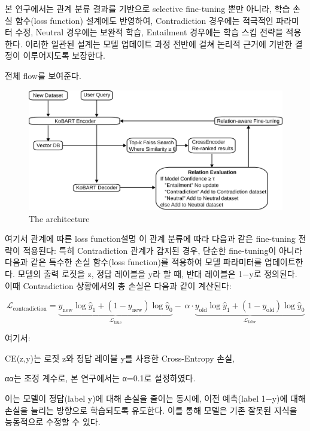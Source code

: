 \documentclass[a4paper,fleqn]{cas-sc}
\begin{document}
 본 연구에서는 관계 분류 결과를 기반으로 selective fine-tuning 뿐만 아니라, 학습 손실 함수(loss function) 설계에도 반영하여, Contradiction 경우에는 적극적인 파라미터 수정, Neutral 경우에는 보완적 학습, Entailment 경우에는 학습 스킵 전략을 적용한다. 
 이러한 일관된 설계는 모델 업데이트 과정 전반에 걸쳐 논리적 근거에 기반한 결정이 이루어지도록 보장한다.

전체 flow를 보여준다.
\begin{figure}[htbp]
    \centering
    \includegraphics[width=\textwidth]{flow.png}
    \caption{The architecture }
\end{figure}


여기서 관계에 따른 loss function설명
이 관계 분류에 따라 다음과 같은 fine-tuning 전략이 적용된다:
특히 Contradiction 관계가 감지된 경우, 단순한 fine-tuning이 아니라 다음과 같은 특수한 손실 함수(loss function)를 적용하여 모델 파라미터를 업데이트한다. 모델의 출력 로짓을 z, 정답 레이블을 y라 할 때, 반대 레이블은 1−y로 정의된다. 이때 Contradiction 상황에서의 총 손실은 다음과 같이 계산된다:

    

\begin{equation}
    \mathcal{L}_{\text{contradiction}} =
    \underbrace{y_{\text{new}} \log \hat{y}_1 + (1 - y_{\text{new}}) \log \hat{y}_0 }_{\mathcal{L}_{\text{true}}}
    -\, \alpha \cdot
    \underbrace{ y_{\text{old}} \log \hat{y}_1 + (1 - y_{\text{old}}) \log \hat{y}_0 }_{\mathcal{L}_{\text{false}}}
\end{equation}

        
여기서:

    CE(z,y)는 로짓 z와 정답 레이블 y를 사용한 Cross-Entropy 손실,

    αα는 조정 계수로, 본 연구에서는 α=0.1로 설정하였다.

이는 모델이 정답(label y)에 대해 손실을 줄이는 동시에, 이전 예측(label 1−y)에 대해 손실을 늘리는 방향으로 학습되도록 유도한다. 이를 통해 모델은 기존 잘못된 지식을 능동적으로 수정할 수 있다.
\end{document}
